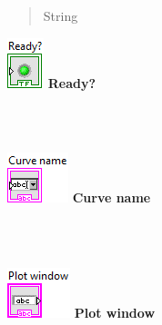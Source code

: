 \documentclass[
]{article}
\begin{document}
\begin{quote}
\hfill\break

String
\end{quote}

\hfill\break

\begin{quote}
\end{quote}

\hfill\break
\hfill\break
\includegraphics{LVtemp20240312184738_17_0.png} \textbf{Ready?\\
}\strut \\
\strut \\
\includegraphics{LVtemp20240312184738_18_0.png} \textbf{Curve name\\
}\strut \\
\strut \\
\includegraphics{LVtemp20240312184738_19_0.png} \textbf{Plot window\\
}\strut \\
\strut \\
\end{document}
